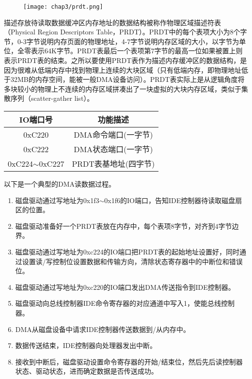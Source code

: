 \begin{figure}[!htbp]
  \centering
  \texttt{[image: chap3/prdt.png]}
\end{figure}

描述存放待读取数据缓冲区内存地址的数据结构被称作物理区域描述符表（Physical Region Descriptors Table，PRDT）。PRDT中的每个表项大小为8个字节，0-3字节说明内存页面的物理地址，4-7字节说明内存区域的大小，以字节为单位，全零表示64K字节。PRDT表最后一个表项第7字节的最高一位如果被置上则表示PRDT表的结束。之所以要使用PRDT表作为描述内存缓冲区的数据结构，是因为很难从低端内存中找到物理上连续的大块区域（只有低端内存，即物理地址低于32MB的内存空间，能被一般DMA设备访问）。PRDT表实际上是从逻辑角度将多块较小的物理上不连续的内存区域拼凑出了一块虚拟的大块内存区域，类似于集散序列（scatter-gather list）。

\begin{table}[htpb]
\centering
\begin{tabular}{cc}
\toprule
IO端口号	& 功能描述\\
\midrule
0xC220	&DMA命令端口(一字节)\\
0xC222	&DMA状态端口(一字节)\\
0xC224$\sim$0xC227 &PRDT表基地址(四字节)\\
\bottomrule
\end{tabular}
\end{table}

以下是一个典型的DMA读数据过程。

\begin{enumerate}
\item 磁盘驱动通过写地址为0x1f3$\sim$0x1f6的IO端口，告知IDE控制器待读取磁盘扇区的位置。

\item 磁盘驱动准备好一个PRDT表放在内存中，每个表项8字节，对齐到4字节边界。

\item 磁盘驱动通过写地址为0xc224的IO端口把PRDT表的起始地址设置好，同时通过设置读/写控制位设置数据和传输方向，清除状态寄存器中的中断位和错误位。

\item 磁盘驱动通过写地址为0xc220的IO端口发出DMA传送指令到IDE控制器。

\item 磁盘驱动向总线控制器IDE命令寄存器的对应通道中写入1，使能总线控制器。

\item DMA从磁盘设备中请求IDE控制器传送数据到/从内存中。

\item 数据传送结束，IDE控制器向处理器发出中断。

\item 接收到中断后，磁盘驱动设置命令寄存器的开始/结束位，然后先后读控制器状态、驱动状态，进而确定数据是否传送成功。
\end{enumerate}

